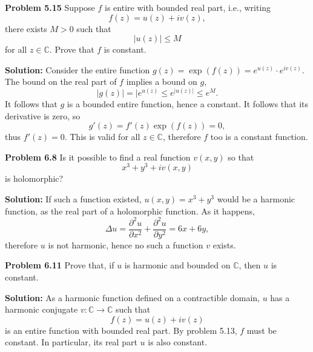 \documentclass[12pt,oneside]{exam}
\newenvironment{exercise}[1]{\vspace{.1in}\noindent\textbf{Problem #1 \hspace{.05em}}}{}
\newcommand{\C}{\mathbb{C}}
\newcommand{\func}[3]{{#1} \colon {#2} \longrightarrow {#3}}
\begin{document}
\vspace{1cm}

\begin{exercise}{5.15}
Suppose $f$ is entire with bounded real part, i.e., writing
\begin{equation*}
f(z)=u(z)+iv(z),
\end{equation*}
there exists $M>0$ such that 
\begin{equation*}
|u(z)| \leq M
\end{equation*}
for all $z \in \mathbb{C}$. Prove that $f$ is constant. 
\end{exercise}

\vspace{0.5cm}

\noindent \textbf{Solution:} 
Consider the entire function $g(z)=\exp(f(z)) = e^{u(z)}\cdot e^{iv(z)}$. The bound on the real part of $f$ implies a bound on $g$, 
\begin{equation*}
|g(z)| = |e^{u(z)} \leq e^{|u(z)|} \leq e^M.
\end{equation*}
It follows that $g$ is a bounded entire function, hence a constant. It follows that its derivative is zero, so 
\begin{equation*}
g'(z)=f'(z)\exp(f(z)) = 0,
\end{equation*}
thus $f'(z)=0$. This is valid for all $z \in \mathbb{C}$, therefore $f$ too is a constant function. 

\vspace{1cm}

\begin{exercise}{6.8}
Is it possible to find a real function $v(x,y)$ so that 
\begin{equation*}
x^3+y^3+iv(x,y)
\end{equation*}
is holomorphic?
\end{exercise}

\vspace{0.5cm}

\noindent \textbf{Solution:}
If such a function existed, $u(x,y) = x^3+y^3$ would be a harmonic function, as the real part of a holomorphic function. As it happens, 
\begin{equation*}
\Delta u = \frac{\partial^2 u}{\partial x^2} + \frac{\partial^2 u}{\partial y^2} = 6x+6y,
\end{equation*}
therefore $u$ is not harmonic, hence no such a function $v$ exists. 

\vspace{1cm}

\begin{exercise}{6.11}
Prove that, if $u$ is harmonic and bounded on $\C$, then $u$ is constant. 
\end{exercise}

\vspace{0.5cm}

\noindent \textbf{Solution:} 
As a harmonic function defined on a contractible domain, $u$ has a harmonic conjugate $\func{v}{\C}{\C}$ such that 
\begin{equation*}
f(z)=u(z)+iv(z)
\end{equation*}
is an entire function with bounded real part. By problem 5.13, $f$ must be constant. In particular, its real part $u$ is also constant.
\end{document}
